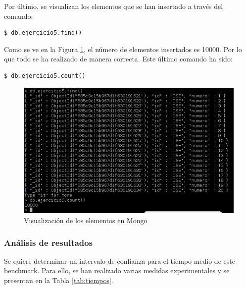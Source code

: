 Por último, se visualizan los elementos que se han insertado a través del comando:
\begin{lstlisting}[style=fich]
$ db.ejercicio5.find()
\end{lstlisting}
\vspace{-22pt}

Como se ve en la Figura \ref{fig:figura5-6}, el número de elementos insertados es 10000. Por lo que todo se ha realizado de manera correcta.
Este último comando ha sido:
\begin{lstlisting}[style=fich]
$ db.ejercicio5.count()
\end{lstlisting}
\vspace{-22pt}

\begin{figure}[H] %
	\centering
	\includegraphics[scale=0.8]{figuras/ejercicio5/figura5-6.png} 
	\caption{Visualización de los elementos en Mongo} 
	\label{fig:figura5-6}
\end{figure}

\newpage

\subsubsection{Análisis de resultados}

Se quiere determinar un intervalo de confianza para el tiempo medio de este benchmark. Para ello, se han realizado varias medidas experimentales y se presentan en la Tabla \ref{tab:tiempos}.


